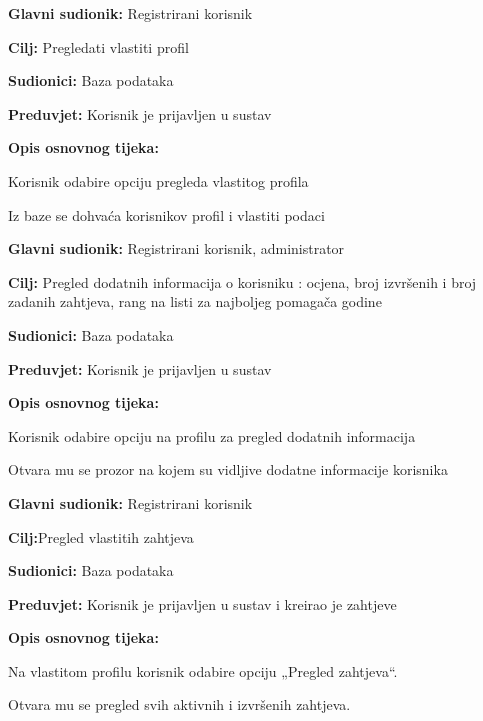 \noindent {}
\begin{packed_item}
	
	\item \textbf{Glavni sudionik: } Registrirani korisnik
	\item  \textbf{Cilj:} Pregledati vlastiti profil
	\item  \textbf{Sudionici:} Baza podataka
	\item  \textbf{Preduvjet:} Korisnik je prijavljen u sustav
	\item  \textbf{Opis osnovnog tijeka:}
	\item[] \begin{packed_enum}
		\item Korisnik odabire opciju pregleda vlastitog profila
		\item Iz baze se dohvaća korisnikov profil i vlastiti podaci
	\end{packed_enum}
\end{packed_item}

\noindent {}
\begin{packed_item}
	\item \textbf{Glavni sudionik: }Registrirani korisnik, administrator
	\item  \textbf{Cilj:} Pregled dodatnih informacija o korisniku : ocjena, broj izvršenih i broj zadanih zahtjeva, rang na listi za najboljeg pomagača godine
	\item  \textbf{Sudionici:} Baza podataka
	\item  \textbf{Preduvjet:} Korisnik je prijavljen u sustav
	\item  \textbf{Opis osnovnog tijeka:}
	\item[] \begin{packed_enum}
		\item Korisnik odabire opciju na profilu za pregled dodatnih informacija  
		\item Otvara mu se prozor na kojem su vidljive dodatne informacije korisnika
	\end{packed_enum}
\end{packed_item}

\noindent {}
\begin{packed_item}
	\item \textbf{Glavni sudionik: }Registrirani korisnik
	\item  \textbf{Cilj:}Pregled vlastitih zahtjeva
	\item  \textbf{Sudionici:} Baza podataka
	\item  \textbf{Preduvjet:} Korisnik je prijavljen u sustav i kreirao je zahtjeve
	\item  \textbf{Opis osnovnog tijeka:}
	\item[] \begin{packed_enum}
		\item Na vlastitom profilu korisnik odabire opciju „Pregled zahtjeva“.
		\item 	Otvara mu se pregled svih aktivnih i izvršenih zahtjeva.
	\end{packed_enum}
\end{packed_item}

